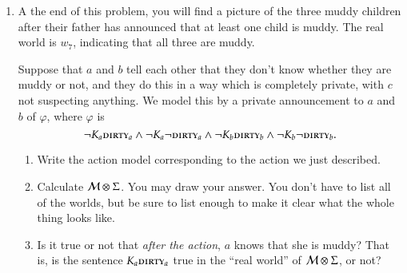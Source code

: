 \documentclass[11pt]{article}
\renewcommand{\phi}{\varphi}
\newcommand{\andd}{\wedge}
\newcommand{\nott}{\neg}
\begin{document}
\begin{enumerate}
\item
A the end of this problem, you will find a picture of the three muddy children
after their father has announced that at least one child is muddy.   
The real world is $w_7$, indicating that all three are muddy.

Suppose that $a$ and $b$ tell each other that they don't know
whether they are muddy or not, and they do this in a way which is completely
private, with $c$ not suspecting anything.    We model this by a private announcement
to $a$ and $b$ of $\phi$, where
$\phi$ is
$$\nott K_a \DirtyA \andd \nott K_a  \nott \DirtyA \andd \nott K_b \DirtyB \andd \nott K_b  \nott \DirtyB. 
$$

\begin{enumerate}
\item  Write the action model corresponding to the action we just described. 
\item   Calculate ${\cal M}\otimes \Sigma$.    You may draw your answer.
 You don't have to list all of the worlds,
but be sure to list enough to make it clear what the whole thing looks like.
\item Is it true or not that \emph{after the action},  $a$ knows that she is muddy?
That is, is the sentence $K_a \mbox{\sc dirty}_a$ true in the ``real world'' of ${\cal M}\otimes \Sigma$, or not?
\end{enumerate}



\end{enumerate}
\end{document}
